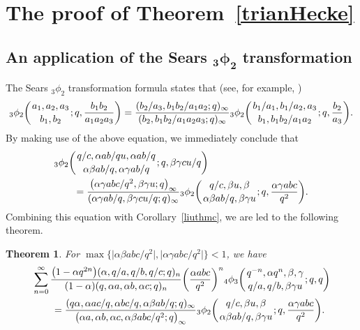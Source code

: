 \documentclass[pdftex]{sigma}
\numberwithin{equation}{section}
\newtheorem{Theorem}{Theorem}[section]
\begin{document}
\section{The proof of Theorem~\ref{trianHecke}}\label{sec5}
\subsection[An application of the Sears \_3phi\_2 transformation]{An application of the Sears $\boldsymbol{_3\phi_2}$ transformation}
The Sears $_3\phi_2$ transformation formula states that (see, for example, \cite[Theorem~3]{Liu2003})
\begin{align*}%
	{_3\phi_2}\biggl({{a_1, a_2, a_3}\atop{b_1, b_2}}; q, \frac{b_1b_2}{a_1a_2a_3}\biggr)
	=\frac{(b_2/a_3, b_1b_2/{a_1 a_2}; q)_\infty}
	{(b_2, b_1b_2/{a_1a_2a_3}; q)_\infty}
	{_3\phi_2}\biggl({{b_1/a_1, b_1/a_2, a_3}\atop{b_1, b_1b_2/{a_1a_2}}}; q, \frac{b_2}{a_3}\biggr).	
\end{align*}	
By making use of the above equation, we immediately conclude that
\begin{align*}
	&{_3\phi_2} \biggl({{q/c, \alpha ab/qu, \alpha ab/q}\atop{\alpha \beta ab/q, \alpha \gamma ab/q}}; q, \beta \gamma cu/q \biggr)\\
	&\qquad{}=\frac{\bigl(\alpha \gamma abc/q^2, \beta \gamma u; q\bigr)_\infty}
	{(\alpha \gamma ab/q, \beta \gamma cu/q; q)_\infty}
	{_3\phi_2} \biggl({{q/c, \beta u, \beta}\atop{\alpha \beta ab/q, \beta \gamma u}}; q, \frac{\alpha \gamma abc}{q^2}\biggr).
\end{align*}
Combining this equation with Corollary~\ref{liuthmc}, we are led to the following theorem.
\begin{Theorem}\label{liuthmd}
	For $\max\bigl\{\bigl|\alpha \beta abc/q^2\bigr|, \bigl|\alpha \gamma abc/q^2\bigr| \bigr\}<1$, we have
	\begin{align*}
		&\sum_{n=0}^\infty \frac{\bigl(1-\alpha q^{2n}\bigr)(\alpha, q/a, q/b, q/c; q)_n}{(1-\alpha)(q, \alpha a, \alpha b, \alpha c; q)_n}\biggl(\frac{\alpha abc}{q^2}\biggr)^n {_4\phi_3}\biggl({{q^{-n}, \alpha q^n, \beta, \gamma}
			\atop{q/a, q/b, \beta \gamma u}}; q, q\biggr)\\
		&\qquad{}=\frac{(q\alpha, \alpha ac/q, \alpha bc/q, \alpha \beta ab/q; q )_\infty}{\bigl(\alpha a, \alpha b, \alpha c, \alpha \beta abc/q^2; q \bigr)_\infty} {_3\phi_2} \biggl({{q/c, \beta u, \beta}\atop{\alpha \beta ab/q, \beta \gamma u}}; q, \frac{\alpha \gamma abc}{q^2}\biggr).
	\end{align*}
\end{Theorem}
\end{document}
